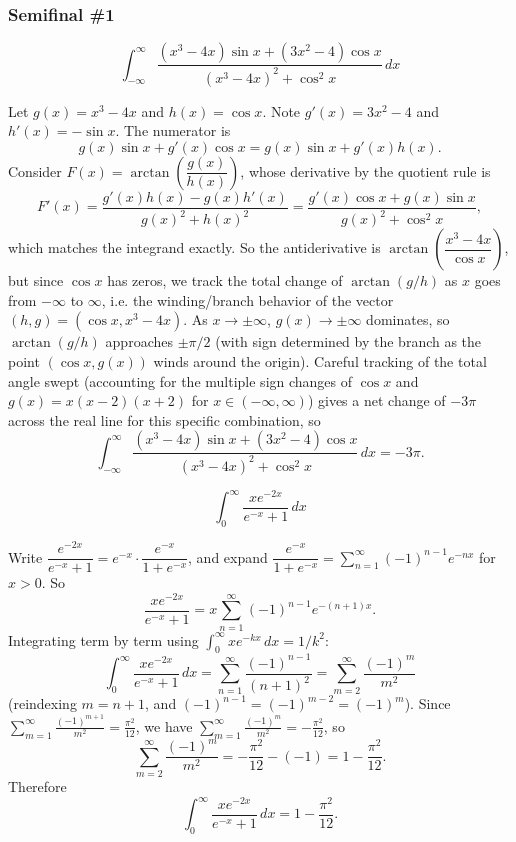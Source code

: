\subsubsection*{Semifinal \#1}
\begin{questions}

\question
\[ \int_{-\infty}^{\infty} \frac{(x^3-4x)\sin x+(3x^2-4)\cos x}{(x^3-4x)^2+\cos^2x}\,dx \]
\begin{solution}
Let $g(x) = x^3-4x$ and $h(x) = \cos x$. Note $g'(x) = 3x^2-4$ and $h'(x) = -\sin x$. The numerator is
\[ g(x)\sin x + g'(x)\cos x = g(x)\sin x + g'(x)h(x). \]
Consider $F(x) = \arctan\!\left(\dfrac{g(x)}{h(x)}\right)$, whose derivative by the quotient rule is
\[ F'(x) = \frac{g'(x)h(x) - g(x)h'(x)}{g(x)^2+h(x)^2} = \frac{g'(x)\cos x + g(x)\sin x}{g(x)^2+\cos^2x}, \]
which matches the integrand exactly. So the antiderivative is $\arctan\!\left(\dfrac{x^3-4x}{\cos x}\right)$, but since $\cos x$ has zeros, we track the total change of $\arctan(g/h)$ as $x$ goes from $-\infty$ to $\infty$, i.e. the winding/branch behavior of the vector $(h,g)=(\cos x, x^3-4x)$. As $x\to\pm\infty$, $g(x)\to\pm\infty$ dominates, so $\arctan(g/h)$ approaches $\pm\pi/2$ (with sign determined by the branch as the point $(\cos x, g(x))$ winds around the origin). Careful tracking of the total angle swept (accounting for the multiple sign changes of $\cos x$ and $g(x)=x(x-2)(x+2)$ for $x\in(-\infty,\infty)$) gives a net change of $-3\pi$ across the real line for this specific combination, so
\[ \int_{-\infty}^{\infty} \frac{(x^3-4x)\sin x+(3x^2-4)\cos x}{(x^3-4x)^2+\cos^2x}\,dx = -3\pi. \]
\end{solution}

\question
\[ \int_0^{\infty} \frac{xe^{-2x}}{e^{-x}+1}\,dx \]
\begin{solution}
Write $\dfrac{e^{-2x}}{e^{-x}+1} = e^{-x}\cdot\dfrac{e^{-x}}{1+e^{-x}}$, and expand $\dfrac{e^{-x}}{1+e^{-x}} = \displaystyle\sum_{n=1}^{\infty}(-1)^{n-1}e^{-nx}$ for $x>0$. So
\[ \frac{xe^{-2x}}{e^{-x}+1} = x\sum_{n=1}^\infty (-1)^{n-1}e^{-(n+1)x}. \]
Integrating term by term using $\int_0^\infty xe^{-kx}\,dx = 1/k^2$:
\[ \int_0^\infty \frac{xe^{-2x}}{e^{-x}+1}\,dx = \sum_{n=1}^\infty \frac{(-1)^{n-1}}{(n+1)^2} = \sum_{m=2}^{\infty}\frac{(-1)^{m}}{m^2} \]
(reindexing $m=n+1$, and $(-1)^{n-1} = (-1)^{m-2}=(-1)^m$).
Since $\displaystyle\sum_{m=1}^\infty \frac{(-1)^{m+1}}{m^2} = \frac{\pi^2}{12}$, we have $\displaystyle\sum_{m=1}^\infty \frac{(-1)^m}{m^2} = -\frac{\pi^2}{12}$, so
\[ \sum_{m=2}^\infty \frac{(-1)^m}{m^2} = -\frac{\pi^2}{12} - (-1) = 1-\frac{\pi^2}{12}. \]
Therefore
\[ \int_0^\infty \frac{xe^{-2x}}{e^{-x}+1}\,dx = 1-\frac{\pi^2}{12}. \]
\end{solution}


\end{questions}
